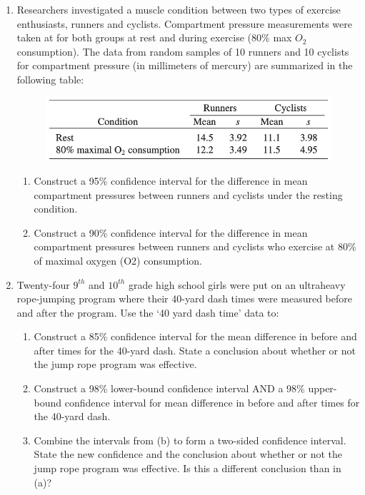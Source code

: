 \documentclass{article}
\begin{document}
\begin{enumerate}
    \item Researchers investigated a muscle condition between two types of exercise enthusiasts, runners and cyclists. Compartment pressure measurements were taken at for both groups at rest and during exercise (80\% max $O_2$ consumption). The data from random samples of 10 runners and 10 cyclists for compartment pressure (in millimeters of mercury) are summarized in the following table:%
    \begin{figure}[H]
        \center\includegraphics[scale=0.5]{Images/data-exercise.png}
    \end{figure}
    \begin{enumerate}
        \item Construct a 95\% confidence interval for the difference in mean compartment pressures between runners and cyclists under the resting condition.
        \item Construct a 90\% confidence interval for the difference in mean compartment pressures between runners and cyclists who exercise at 80\% of maximal oxygen (O2) consumption.
    \end{enumerate}\bigskip
    
    \item Twenty-four $9^{th}$ and $10^{th}$ grade high school girls were put on an ultraheavy rope-jumping program where their 40-yard dash times were measured before and after the program. Use the `40 yard dash time' data to:
    \begin{enumerate}%
        \item Construct a 85\% confidence interval for the mean difference in before and after times for the 40-yard dash. State a conclusion about whether or not the jump rope program was effective.
        \item Construct a 98\% lower-bound confidence interval AND a 98\% upper-bound confidence interval for mean difference in before and after times for the 40-yard dash.%
        \item Combine the intervals from (b) to form a two-sided confidence interval. State the new confidence and the conclusion about whether or not the jump rope program was effective. Is this a different conclusion than in (a)?%
    \end{enumerate}
\end{enumerate}\bigskip
\end{document}
